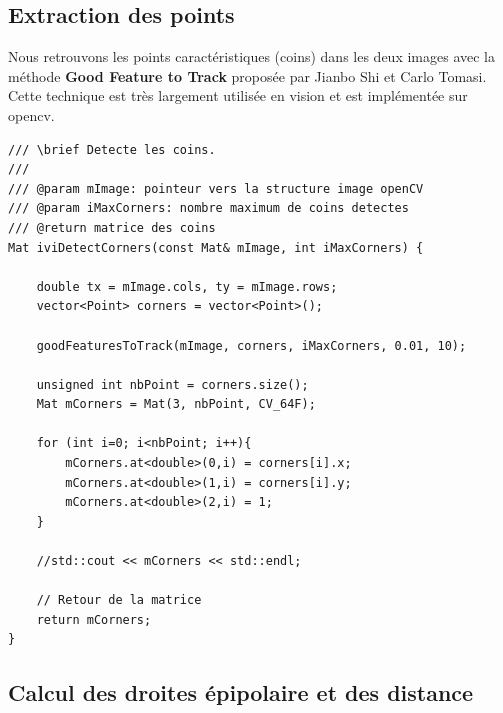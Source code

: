 \documentclass[a4paper,11pt]{article}
\begin{document}
\subsection{Extraction des points}

Nous retrouvons les points caractéristiques (coins) dans les deux images avec la méthode 
\textbf{Good Feature to Track} proposée par Jianbo Shi et Carlo Tomasi. Cette technique est 
très largement utilisée en vision et est implémentée sur opencv.

\begin{lstlisting}[caption=Fonction d'extraction des coins]
/// \brief Detecte les coins.
///
/// @param mImage: pointeur vers la structure image openCV
/// @param iMaxCorners: nombre maximum de coins detectes
/// @return matrice des coins
Mat iviDetectCorners(const Mat& mImage, int iMaxCorners) {

    double tx = mImage.cols, ty = mImage.rows;
    vector<Point> corners = vector<Point>();

    goodFeaturesToTrack(mImage, corners, iMaxCorners, 0.01, 10);

    unsigned int nbPoint = corners.size();
    Mat mCorners = Mat(3, nbPoint, CV_64F);

    for (int i=0; i<nbPoint; i++){
        mCorners.at<double>(0,i) = corners[i].x;
        mCorners.at<double>(1,i) = corners[i].y;
        mCorners.at<double>(2,i) = 1;
    }

    //std::cout << mCorners << std::endl;

    // Retour de la matrice
    return mCorners;
}
\end{lstlisting}

\begin{figure}[H]
  \centering
\end{figure}

\subsection{Calcul des droites épipolaire et des distance}
\end{document}

